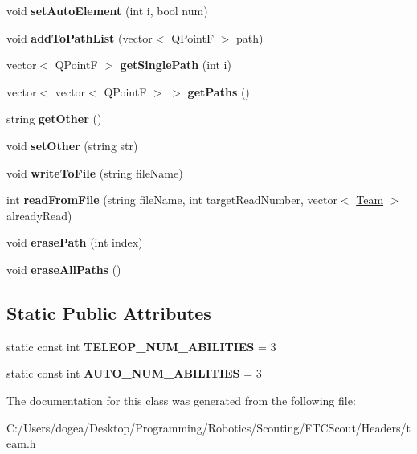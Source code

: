 \begin{DoxyCompactItemize}
void {\bfseries set\+Auto\+Element} (int i, bool num)
\item 
\hypertarget{class_team_ade87e9b263d6db2fe6182d452b6d1c86}{}\label{class_team_ade87e9b263d6db2fe6182d452b6d1c86} 
void {\bfseries add\+To\+Path\+List} (vector$<$ Q\+PointF $>$ path)
\item 
\hypertarget{class_team_a817413d08a986d587cfc3f956747d302}{}\label{class_team_a817413d08a986d587cfc3f956747d302} 
vector$<$ Q\+PointF $>$ {\bfseries get\+Single\+Path} (int i)
\item 
\hypertarget{class_team_a428e94b1b2cd8cc9ac98cc1b1a99f9bd}{}\label{class_team_a428e94b1b2cd8cc9ac98cc1b1a99f9bd} 
vector$<$ vector$<$ Q\+PointF $>$ $>$ {\bfseries get\+Paths} ()
\item 
\hypertarget{class_team_a42c7673c22080863593daf8b1634d2f4}{}\label{class_team_a42c7673c22080863593daf8b1634d2f4} 
string {\bfseries get\+Other} ()
\item 
\hypertarget{class_team_a404115b44f2a98a0771126a61d6f35d2}{}\label{class_team_a404115b44f2a98a0771126a61d6f35d2} 
void {\bfseries set\+Other} (string str)
\item 
\hypertarget{class_team_a8245bef50c20b4b5caed0525ebbfaea5}{}\label{class_team_a8245bef50c20b4b5caed0525ebbfaea5} 
void {\bfseries write\+To\+File} (string file\+Name)
\item 
\hypertarget{class_team_adc5f6d480da08975cfdb402a4ec9844c}{}\label{class_team_adc5f6d480da08975cfdb402a4ec9844c} 
int {\bfseries read\+From\+File} (string file\+Name, int target\+Read\+Number, vector$<$ \hyperlink{class_team}{Team} $>$ already\+Read)
\item 
\hypertarget{class_team_adc86367c9f0132e20df8f7d336e8eed2}{}\label{class_team_adc86367c9f0132e20df8f7d336e8eed2} 
void {\bfseries erase\+Path} (int index)
\item 
\hypertarget{class_team_a44f8d9369753d254028b4508490b687e}{}\label{class_team_a44f8d9369753d254028b4508490b687e} 
void {\bfseries erase\+All\+Paths} ()
\end{DoxyCompactItemize}
\subsection*{Static Public Attributes}
\begin{DoxyCompactItemize}
\item 
\hypertarget{class_team_abd61cb331b997f7dc6a355886de59fc7}{}\label{class_team_abd61cb331b997f7dc6a355886de59fc7} 
static const int {\bfseries T\+E\+L\+E\+O\+P\+\_\+\+N\+U\+M\+\_\+\+A\+B\+I\+L\+I\+T\+I\+ES} = 3
\item 
\hypertarget{class_team_ac9866eaa1c3385d129ea663c34587717}{}\label{class_team_ac9866eaa1c3385d129ea663c34587717} 
static const int {\bfseries A\+U\+T\+O\+\_\+\+N\+U\+M\+\_\+\+A\+B\+I\+L\+I\+T\+I\+ES} = 3
\end{DoxyCompactItemize}


The documentation for this class was generated from the following file\+:\begin{DoxyCompactItemize}
\item 
C\+:/\+Users/dogea/\+Desktop/\+Programming/\+Robotics/\+Scouting/\+F\+T\+C\+Scout/\+Headers/team.\+h\end{DoxyCompactItemize}
